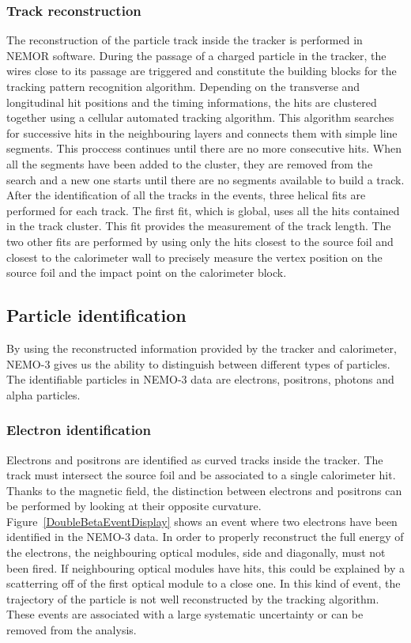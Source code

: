 \documentclass[main.tex]{subfiles}
\begin{document}
\subsubsection{Track reconstruction}


\NI The reconstruction of the particle track inside the tracker is performed in NEMOR software. During the passage of a charged particle in the tracker, the wires close to its passage are triggered and constitute the building blocks for the tracking pattern recognition algorithm. Depending on the transverse and longitudinal hit positions and the timing informations, the hits are clustered together using a cellular automated tracking algorithm. This algorithm searches for successive hits in the neighbouring layers and connects them with simple line segments. This proccess continues until there are no more consecutive hits. When all the segments have been added to the cluster, they are removed from the search and a new one starts until there are no segments available to build a track. After the identification of all the tracks in the events, three helical fits are performed for each track. The first fit, which is global, uses all the hits contained in the track cluster. This fit provides the measurement of the track length. The two other fits are performed by using only the hits closest to the source foil and closest to the calorimeter wall to precisely measure the vertex position on the source foil and the impact point on the calorimeter block.


\subsection{Particle identification}\label{sec:PIDanalysis}


\NI By using the reconstructed information provided by the tracker and calorimeter, NEMO-3 gives us the ability to distinguish between different types of particles. The identifiable particles in NEMO-3 data are electrons, positrons, photons and alpha particles.


\subsubsection{Electron identification}


\NI Electrons and positrons are identified as curved tracks inside the tracker. The track must intersect the source foil and be associated to a single calorimeter hit. Thanks to the magnetic field, the distinction between electrons and positrons can be performed by looking at their opposite curvature. Figure~\ref{DoubleBetaEventDisplay} shows an event where two electrons have been identified in the NEMO-3 data. In order to properly reconstruct the full energy of the electrons, the neighbouring optical modules, side and diagonally, must not been fired. If neighbouring optical modules have hits, this could be explained by a scatterring off of the first optical module to a close one. In this kind of event, the trajectory of the particle is not well reconstructed by the tracking algorithm. These events are associated with a large systematic uncertainty or can be removed from the analysis.
\end{document}

